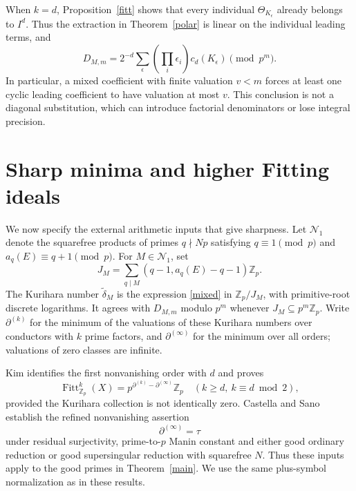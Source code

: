 \documentclass[11pt]{article}
\theoremstyle{remark}\newtheorem{remark}[theorem]{Remark}
\newcommand{\Z}{\mathbb Z}\newcommand{\Q}{\mathbb Q}\newcommand{\F}{\mathbb F}
\newcommand{\Fitt}{\operatorname{Fitt}}
\begin{document}
When $k=d$, Proposition~\ref{fitt} shows that every individual $\Theta_{K_\epsilon}$ already belongs to $I^d$. Thus the extraction in Theorem~\ref{polar} is linear on the individual leading terms, and
\begin{equation}
 D_{M,m}=2^{-d}\sum_{\epsilon}
 \left(\prod_i\epsilon_i\right)c_d(K_\epsilon)\pmod{p^m}.
 \label{leadpolar}
\end{equation}
In particular, a mixed coefficient with finite valuation $v<m$ forces at least one cyclic leading coefficient to have valuation at most $v$. This conclusion is not a diagonal substitution, which can introduce factorial denominators or lose integral precision.

\section{Sharp minima and higher Fitting ideals}
We now specify the external arithmetic inputs that give sharpness. Let $\mathcal N_1$ denote the squarefree products of primes $q\nmid Np$ satisfying $q\equiv1\pmod p$ and $a_q(E)\equiv q+1\pmod p$. For $M\in\mathcal N_1$, set
\[
 J_M=\sum_{q\mid M}(q-1,a_q(E)-q-1)\Z_p.
\]
The Kurihara number $\widetilde\delta_M$ is the expression \eqref{mixed} in $\Z_p/J_M$, with primitive-root discrete logarithms. It agrees with $D_{M,m}$ modulo $p^m$ whenever $J_M\subseteq p^m\Z_p$. Write $\partial^{(k)}$ for the minimum of the valuations of these Kurihara numbers over conductors with $k$ prime factors, and $\partial^{(\infty)}$ for the minimum over all orders; valuations of zero classes are infinite.

Kim \cite[Thm.~1.8]{Kim} identifies the first nonvanishing order with $d$ and proves
\begin{equation}
 \Fitt^k_{\Z_p}(X)=p^{\partial^{(k)}-\partial^{(\infty)}}\Z_p
 \quad(k\geq d,\ k\equiv d\bmod2),\label{kim}
\end{equation}
provided the Kurihara collection is not identically zero. Castella and Sano \cite[Thm.~B]{CS} establish the refined nonvanishing assertion
\[
 \partial^{(\infty)}=\tau
\]
under residual surjectivity, prime-to-$p$ Manin constant and either good ordinary reduction or good supersingular reduction with squarefree $N$. Thus these inputs apply to the good primes in Theorem~\ref{main}. We use the same plus-symbol normalization as in these results.
\end{document}
